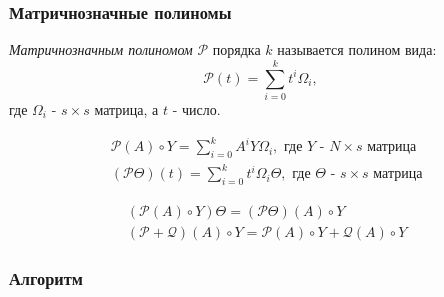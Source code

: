 \subsubsection{Матричнозначные полиномы}
\begin{definition}
    \textit{Матричнозначным полиномом} $\mathcal{P}$ порядка $k$ называется полином вида:
    \begin{equation*}
        \mathcal{P}(t) = \sum_{i=0}^k t^i \Omega_i,
    \end{equation*} 
    где $\Omega_i$ - $s \times s$ матрица, а $t$ - число. 
\end{definition}
\begin{definition}
    \begin{align*}
        &\mathcal{P}(A) \circ Y = \sum_{i=0}^{k} A^i Y \Omega_i,\text{ где $Y$ - $N \times s$ матрица} \\
        &(\mathcal{P}\Theta)(t) = \sum_{i=0}^k t^i \Omega_i \Theta, \text{ где $\Theta$ - $s \times s$ матрица}
    \end{align*}
\end{definition}
\begin{preposition}
    \label{prep:propoperpoly}
\begin{align*}
    & (\mathcal{P}(A) \circ Y) \Theta = (\mathcal{P} \Theta ) (A) \circ Y \\
    & (\mathcal{P} + \mathcal{Q})(A) \circ Y = \mathcal{P}(A) \circ Y + \mathcal{Q}(A) \circ Y
\end{align*}
\end{preposition}

 \subsubsection{Алгоритм}

